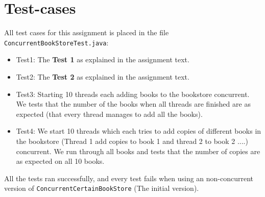 \documentclass[10pt,a4paper]{article}
\begin{document}
\section*{Test-cases}
All test cases for this assignment is placed in the file \texttt{ConcurrentBookStoreTest.java}:
\begin{itemize}
\item Test1: The \textbf{Test 1} as explained in the assignment text.
\item Test2: The \textbf{Test 2} as explained in the assignment text.
\item Test3:
Starting 10 threads each adding books to the bookstore concurrent. We tests that the number of the books when all threads are finished are as expected (that every thread manages to add all the books).
\item Test4:
We start 10 threads which each tries to add copies of different books in the bookstore (Thread 1 add copies to book 1 and thread 2 to book 2 ....) concurrent. We run through all books and tests that the number of copies are as expected on all 10 books. 
\end{itemize}
All the tests ran successfully, and every test fails when using an non-concurrent version of \texttt{ConcurrentCertainBookStore} (The initial version).
\end{document}
